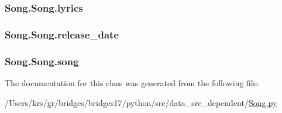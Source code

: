 \subsubsection[{lyrics}]{\setlength{\rightskip}{0pt plus 5cm}Song.\+Song.\+lyrics}\label{class_song_1_1_song_a615d9c5a45416c8bc394f0f8933ea01b}
\hypertarget{class_song_1_1_song_ae8e1db27b18ac777478522a33fb2a611}{}
\subsubsection[{release\+\_\+date}]{\setlength{\rightskip}{0pt plus 5cm}Song.\+Song.\+release\+\_\+date}\label{class_song_1_1_song_ae8e1db27b18ac777478522a33fb2a611}
\hypertarget{class_song_1_1_song_ace7c0f2f4985b73383d754c73caef745}{}
\subsubsection[{song}]{\setlength{\rightskip}{0pt plus 5cm}Song.\+Song.\+song}\label{class_song_1_1_song_ace7c0f2f4985b73383d754c73caef745}


The documentation for this class was generated from the following file\+:\begin{DoxyCompactItemize}
\item 
/\+Users/krs/gr/bridges/bridges17/python/src/data\+\_\+src\+\_\+dependent/\hyperlink{_song_8py}{Song.\+py}\end{DoxyCompactItemize}
